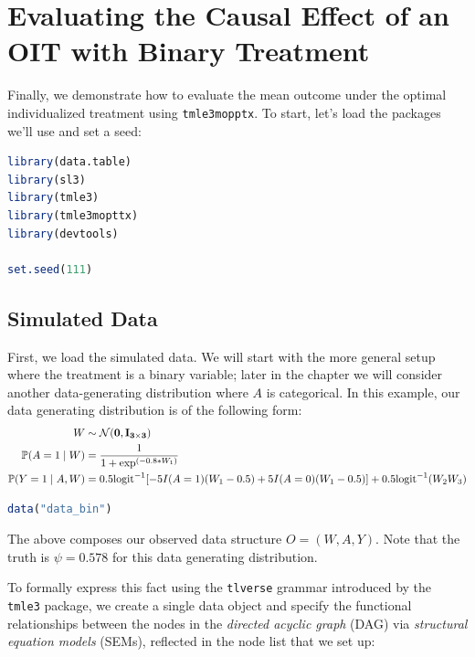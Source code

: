 \documentclass[
  12pt, krantz2,
]{krantz}
\newcommand{\passthrough}[1]{#1}
\renewcommand{\P}{\mathbb{P}}
\newcommand{\1}{\mathbbm{1}}
\theoremstyle{definition}
\theoremstyle{definition}
\theoremstyle{definition}
\theoremstyle{definition}
\theoremstyle{remark}
\begin{document}
\hypertarget{oit-eval-bin}{%
\section{Evaluating the Causal Effect of an OIT with Binary Treatment}\label{oit-eval-bin}}

Finally, we demonstrate how to evaluate the mean outcome under the optimal
individualized treatment using \passthrough{\lstinline!tmle3mopptx!}. To start, let's load the packages
we'll use and set a seed:

\begin{lstlisting}[language=R]
library(data.table)
library(sl3)
library(tmle3)
library(tmle3mopttx)
library(devtools)

set.seed(111)
\end{lstlisting}

\hypertarget{simulated-data}{%
\subsection{Simulated Data}\label{simulated-data}}

First, we load the simulated data. We will start with the more general setup
where the treatment is a binary variable; later in the chapter we will consider
another data-generating distribution where \(A\) is categorical. In this example,
our data generating distribution is of the following form:
\begin{align*}
  W &\sim \mathcal{N}(\bf{0},I_{3 \times 3})\\
  \P(A=1 \mid W) &= \frac{1}{1+\exp^{(-0.8*W_1)}}\\
  \P(Y=1 \mid A,W) &= 0.5\text{logit}^{-1}[-5I(A=1)(W_1-0.5)+5I(A=0)(W_1-0.5)] +
     0.5\text{logit}^{-1}(W_2W_3)
\end{align*}

\begin{lstlisting}[language=R]
data("data_bin")
\end{lstlisting}

The above composes our observed data structure \(O = (W, A, Y)\). Note that the
truth is \(\psi=0.578\) for this data generating distribution.

To formally express this fact using the \passthrough{\lstinline!tlverse!} grammar introduced by the
\passthrough{\lstinline!tmle3!} package, we create a single data object and specify the functional
relationships between the nodes in the \emph{directed acyclic graph} (DAG) via
\emph{structural equation models} (SEMs), reflected in the node list
that we set up:
\end{document}
